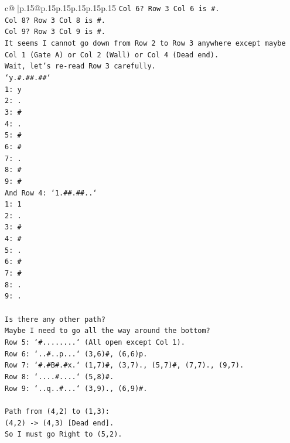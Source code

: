 \documentclass{article}
\begin{document}
{\begin{supertabular}{c@{$\;$}|p{.15\linewidth}@{}p{.15\linewidth}p{.15\linewidth}p{.15\linewidth}p{.15\linewidth}p{.15\linewidth}}
{{{\texttt{Col 6? Row 3 Col 6 is \#.} \\
\texttt{Col 8? Row 3 Col 8 is \#.} \\
\texttt{Col 9? Row 3 Col 9 is \#.} \\
\texttt{It seems I cannot go down from Row 2 to Row 3 anywhere except maybe Col 1 (Gate A) or Col 2 (Wall) or Col 4 (Dead end).} \\
\texttt{Wait, let's re{-}read Row 3 carefully.} \\
\texttt{`y.\#.\#\#.\#\#`} \\
\texttt{1: y} \\
\texttt{2: .} \\
\texttt{3: \#} \\
\texttt{4: .} \\
\texttt{5: \#} \\
\texttt{6: \#} \\
\texttt{7: .} \\
\texttt{8: \#} \\
\texttt{9: \#} \\
\texttt{And Row 4: `1.\#\#.\#\#..`} \\
\texttt{1: 1} \\
\texttt{2: .} \\
\texttt{3: \#} \\
\texttt{4: \#} \\
\texttt{5: .} \\
\texttt{6: \#} \\
\texttt{7: \#} \\
\texttt{8: .} \\
\texttt{9: .} \\
\\ 
\texttt{Is there any other path?} \\
\texttt{Maybe I need to go all the way around the bottom?} \\
\texttt{Row 5: `\#........` (All open except Col 1).} \\
\texttt{Row 6: `..\#..p...` (3,6)\#, (6,6)p.} \\
\texttt{Row 7: `\#.\#B\#.\#x.` (1,7)\#, (3,7)., (5,7)\#, (7,7)., (9,7).} \\
\texttt{Row 8: `....\#....` (5,8)\#.} \\
\texttt{Row 9: `..q..\#...` (3,9)., (6,9)\#.} \\
\\ 
\texttt{Path from (4,2) to (1,3):} \\
\texttt{(4,2) {-}> (4,3) {[}Dead end{]}.} \\
\texttt{So I must go Right to (5,2).} \\
}}}
\end{supertabular}}
\end{document}
